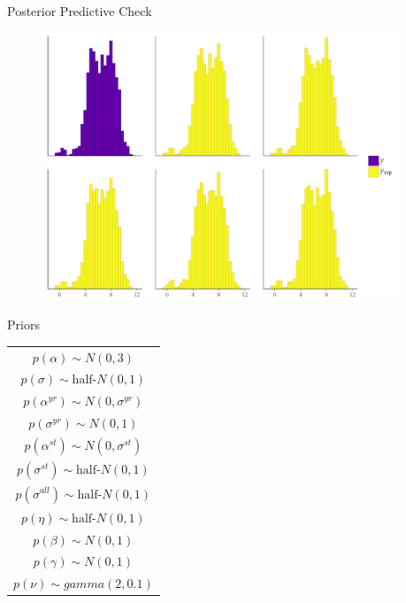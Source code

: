\documentclass{beamer}
\begin{document}
\begin{frame}{Posterior Predictive Check}


\begin{figure}
	\centering
		\includegraphics[width=0.95\textwidth]{ppc.png}
	\label{fig:ppc}
\end{figure}


\end{frame}




\begin{frame}{Priors}

\begin{table} %

 \begin{center}
\begin{tabular}{c} 
$ p(\alpha) \sim N(0, 3)$  \\
$ p(\sigma) \sim \mbox{half-}N(0, 1) $ \\
$ p(\alpha^{yr}) \sim N(0, \sigma^{yr}) $ \\ 
$ p(\sigma^{yr}) \sim N(0, 1) $ \\
$ p(\alpha^{st}) \sim N(0, \sigma^{st}) $ \\ 
$ p(\sigma^{st}) \sim \mbox{half-}N(0, 1) $ \\ 
$ p(\sigma^{all}) \sim \mbox{half-}N(0, 1) $ \\
$ p(\eta) \sim \mbox{half-}N(0, 1) $ \\
$ p(\beta) \sim N(0, 1) $ \\
$ p(\gamma) \sim N(0, 1) $ \\ 
$ p(\nu) \sim gamma(2, 0.1)$ 
\end{tabular} 
\end{center} 
\label{tab:priors}
\end{table} 


\end{frame}
\end{document}
